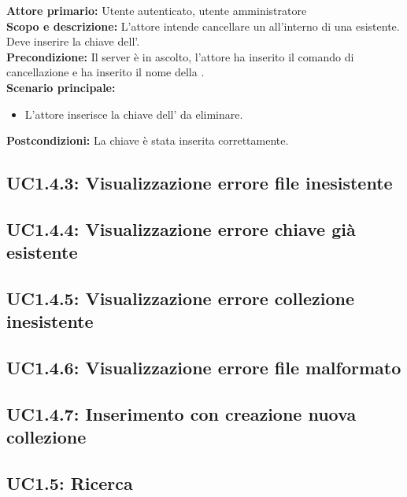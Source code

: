 \documentclass{scalatekids-article}
\begin{document}
\textbf{Attore primario:} Utente autenticato, utente amministratore\\
\textbf{Scopo e descrizione:} L'attore intende cancellare un  all'interno di una  esistente. Deve inserire la chiave dell'.\\
\textbf{Precondizione:} Il server è in ascolto, l'attore ha inserito il comando di cancellazione  e ha inserito il nome della .\\
\textbf{Scenario principale:}
\begin{itemize}
\item L'attore inserisce la chiave dell' da eliminare.
\end{itemize}
\textbf{Postcondizioni:} La chiave è stata inserita correttamente.

\subsection{UC1.4.3: Visualizzazione errore file inesistente}

\subsection{UC1.4.4: Visualizzazione errore chiave già esistente}

\subsection{UC1.4.5: Visualizzazione errore collezione inesistente}

\subsection{UC1.4.6: Visualizzazione errore file malformato}

\subsection{UC1.4.7: Inserimento con creazione nuova collezione}

\subsection{UC1.5: Ricerca}
\end{document}
